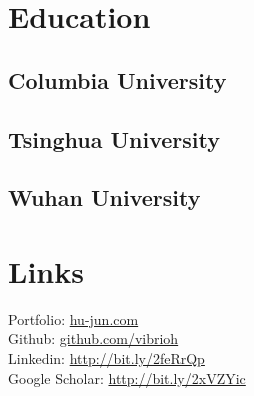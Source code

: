 \documentclass[]{junhu_resume}
\begin{document}
%
%
\lastupdated

%
%
\begin{minipage}[t]{0.33\textwidth} 
\end{minipage}
\hfill
\begin{minipage}[t]{0.66\textwidth} 
\end{minipage}

\sepsection

%
%

\begin{minipage}[t]{0.33\textwidth} 


\section{Education} 

\subsection{Columbia University}
\sectionsep

\subsection{Tsinghua University}
\sectionsep

\subsection{Wuhan University}
\sectionsep


\section{Links} 
Portfolio: \href{http://www.hu-jun.com}{hu-jun.com}\\
Github: \href{https://github.com/vibrioh}{github.com/vibrioh}\\
Linkedin: \href{https://www.linkedin.com/in/jun-hu-664639a2/}{http://bit.ly/2feRrQp} \\
Google Scholar: \href{https://scholar.google.com/citations?user=Vr8dYJsAAAAJ}{http://bit.ly/2xVZYic}
\sectionsep


\end{minipage}
\end{document}
